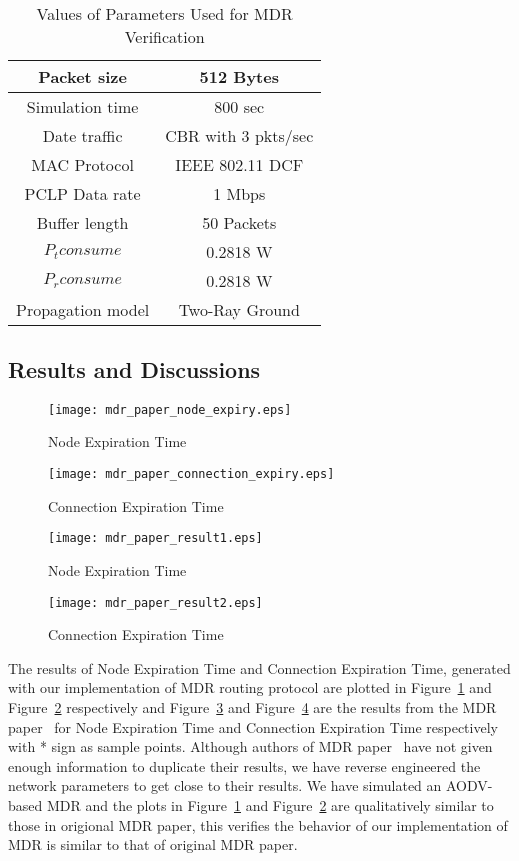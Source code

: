 \begin{table}[htbp]
\centering
  \caption{Values of Parameters Used for MDR Verification}
  \hfill \\	
  \begin{tabular}{|c|c|}
  \hline
  Packet size & 512 Bytes \\
  \hline
  Simulation time & 800 sec \\
  \hline
  Date traffic & CBR with 3 pkts/sec\\
  \hline
  MAC Protocol & IEEE 802.11 DCF \\
  \hline
  PCLP Data rate & 1 Mbps \\
  \hline
  Buffer length & 50 Packets \\
  \hline
  $P_{t}consume$ & 0.2818 W \\
  \hline
  $P_{r}consume$ & 0.2818 W \\
  \hline
  Propagation model & Two-Ray Ground \\
  \hline
  \end{tabular}
  \label{tab54}
\end{table}

\subsection{Results and Discussions}
\label{results-mdr}
\begin{figure}[htbp]
	\centering
	\texttt{[image: mdr\_paper\_node\_expiry.eps]}
	\caption{Node Expiration Time}
	\label{fig58}
\end{figure}

\begin{figure}[htbp]
	\centering
	\texttt{[image: mdr\_paper\_connection\_expiry.eps]}
	\caption{Connection Expiration Time}
	\label{fig59}
\end{figure}

\begin{figure}[htbp]
	\centering
	\texttt{[image: mdr\_paper\_result1.eps]}
	\caption{Node Expiration Time~\cite{mdr}}
	\label{fig510}
\end{figure}

\begin{figure}[htbp]
	\centering
	\texttt{[image: mdr\_paper\_result2.eps]}
	\caption{Connection Expiration Time~\cite{mdr}}
	\label{fig511}
\end{figure}

The results of Node Expiration Time and Connection Expiration Time, generated with our implementation of MDR routing protocol are plotted in Figure~\ref{fig58} and Figure~\ref{fig59} respectively and Figure~\ref{fig510} and Figure~\ref{fig511} are the results from the MDR paper~\cite{mdr} for Node Expiration Time and Connection Expiration Time respectively with * sign as sample points. Although authors of MDR paper~\cite{mdr} have not given enough information to duplicate their results, we have reverse engineered the network parameters to get close to their results. We have simulated an AODV-based MDR and the plots in Figure~\ref{fig58} and Figure~\ref{fig59} are qualitatively similar to those in origional MDR paper, this verifies the behavior of our implementation of MDR is similar to that of original MDR paper.

